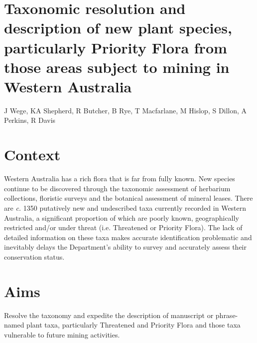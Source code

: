 \documentclass[version=last,
    paper=a4, %
    10pt, %
    usenames,
    dvipsnames,
    oneside, %
    headings=openany, %
    DIV=15 %
]{scrbook}
\begin{document}
\section*{Taxonomic resolution and description of new plant species, particularly
Priority Flora from those areas subject to mining in Western Australia
}

J Wege, KA Shepherd, R Butcher, B Rye, T Macfarlane, M Hislop, S Dillon,
A Perkins, R Davis


\section*{Context}
Western Australia has a rich flora that is far from fully known. New
species continue to be discovered through the taxonomic assessment of
herbarium collections, floristic surveys and the botanical assessment of
mineral leases. There are \emph{c.} 1350 putatively new and undescribed
taxa currently recorded in Western Australia, a significant proportion
of which are poorly known, geographically restricted and/or under threat
(i.e. Threatened or Priority Flora). The lack of detailed information on
these taxa makes accurate identification problematic and inevitably
delays the Department's ability to survey and accurately assess their
conservation status.



\section*{Aims}
Resolve the taxonomy and expedite the description of manuscript or
phrase-named plant taxa, particularly Threatened and Priority Flora and
those taxa vulnerable to future mining activities.
\end{document}
